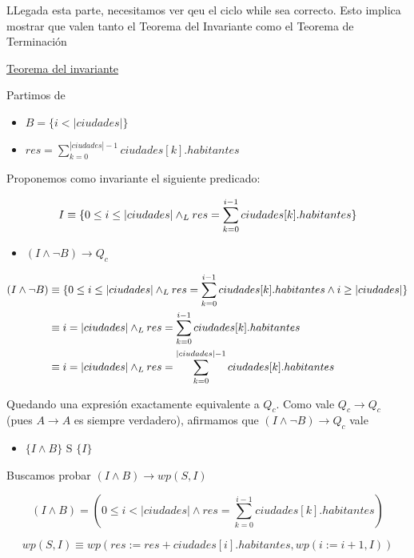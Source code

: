 \documentclass[10pt,a4paper]{article}
\begin{document}
\begin {enumerate}
    LLegada esta parte, necesitamos ver qeu el ciclo while sea correcto. Esto implica mostrar que valen tanto el Teorema del Invariante como el 
    Teorema de Terminación

    \underline{Teorema del invariante}

    Partimos de 

    \begin{itemize}
        \item $B = \{i < |ciudades| \}$
        \item $res =  \sum\limits_{k=0}^{|ciudades| - 1}{ciudades[k].habitantes}$
    \end{itemize}

    Proponemos como invariante el siguiente predicado: 

    $$I \equiv \{0 \leq i \leq |ciudades| \land _L res = \sum\limits_{k=0}^{i - 1}{ciudades[k].habitantes}\}$$

    \begin{itemize}
        \item $(I \land \neg B) \to Q_{c}$
    \end{itemize}

    \begin{align*}
        (I \land \neg B) &\equiv \{0 \leq i \leq |ciudades| \land _L res = \sum\limits_{k=0}^{i - 1}{ciudades[k].habitantes} \land i \geq |ciudades|\} \\
        &\equiv i = |ciudades| \land _L res = \sum\limits_{k=0}^{i - 1}{ciudades[k].habitantes} \\
        &\equiv i = |ciudades| \land _L res = \sum\limits_{k=0}^{|ciudades| - 1}{ciudades[k].habitantes}
    \end{align*}

    Quedando una expresión exactamente equivalente a $Q_{c}$. Como vale $Q_{c} \to Q_{c}$ (pues $A \to A$ es siempre verdadero), afirmamos que $(I \land \neg B) \to Q_{c}$ vale 


    \begin{itemize}
    \item $ \{I \land B\}$ S $\{I\}$
    \end{itemize}

    Buscamos probar $(I \land B) \to wp(S, I)$

    $$ (I \land B) = (0 \leq i < |ciudades| \land res = \sum\limits_{k=0}^{i - 1}{ciudades[k].habitantes})$$

    $$wp(S, I) \equiv wp(res := res + ciudades[i].habitantes, wp(i := i + 1, I))$$


\end{enumerate}
\end{document}
